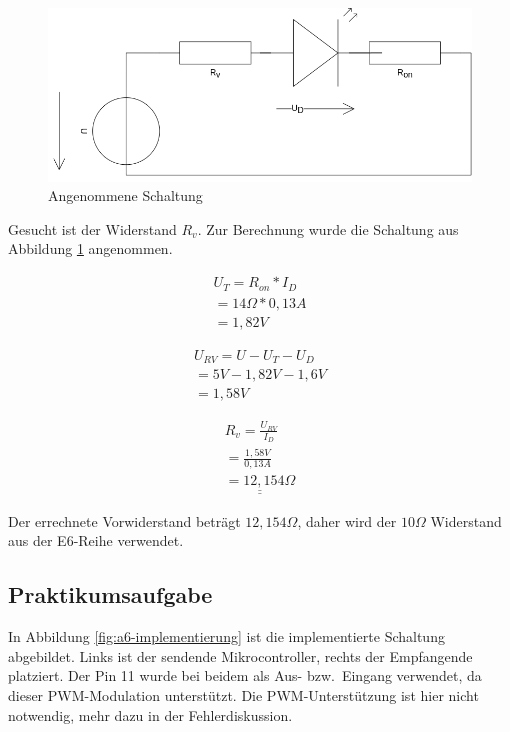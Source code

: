 \begin{figure}[h]
    \centering
    \includegraphics[height=0.3\textheight]{pictures/a7-rechnung-vorwiderstand.png}
    \caption{Angenommene Schaltung}
    \label{fig:a7-angenommene-schaltung}
\end{figure}

Gesucht ist der Widerstand $R_v$.
Zur Berechnung wurde die Schaltung aus Abbildung \ref{fig:a7-angenommene-schaltung} angenommen.

\begin{align}
    U_T = R_{on} * I_D \\
    = 14\Omega * 0,13A \\
    = 1,82V
\end{align}

\begin{align}
    U_{RV} = U - U_T - U_D \\
    = 5V - 1,82V - 1,6V \\
    = 1,58V
\end{align}

\begin{align}
    R_v = \frac{U_{RV}}{I_D} \\
    = \frac{1,58V}{0,13A} \\
    \underline{\underline{= 12,154\Omega}}
\end{align}

Der errechnete Vorwiderstand beträgt $12,154\Omega$, daher wird der $10\Omega$ Widerstand aus der E6-Reihe verwendet.

\subsection{Praktikumsaufgabe}
\label{subsec:a7-praktikumsaufgabe}

In Abbildung \ref{fig:a6-implementierung} ist die implementierte Schaltung abgebildet.
Links ist der sendende Mikrocontroller, rechts der Empfangende platziert.
Der Pin 11 wurde bei beidem als Aus- bzw.\ Eingang verwendet, da dieser PWM-Modulation unterstützt.
Die PWM-Unterstützung ist hier nicht notwendig, mehr dazu in der Fehlerdiskussion.

